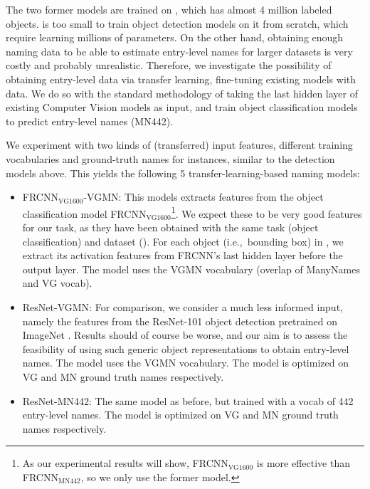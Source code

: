 The two former models are trained on \vg, which has almost 4 million labeled objects.
\mn is too small to train object detection models on it from scratch, which require learning millions of parameters.
On the other hand, obtaining enough naming data to be able to estimate entry-level names for larger datasets is very costly and probably unrealistic.
Therefore, we investigate the possibility of obtaining entry-level data via transfer learning, fine-tuning existing models with \mn data.
We do so with the standard methodology of taking the last hidden layer of existing Computer Vision models as input, and train object classification models to predict entry-level names (MN442).

We experiment with two kinds of (transferred) input features, different training vocabularies and ground-truth names for instances, similar to the detection models above.
This yields the following 5 transfer-learning-based naming models:

\begin{small}
\begin{itemize}
\item FRCNN$_{\text{VG1600}}$-VGMN:  This models extracts features from the object classification model FRCNN$_{\text{VG1600}}$\footnote{As our experimental results will show, FRCNN$_{\text{VG1600}}$ is more effective than FRCNN$_{\text{MN442}}$, so we only use the former model.}. We expect these to be very good features for our task, as they have been obtained with the same task (object classification) and dataset (\vg).  For each object (i.e.,~bounding box) in \mn, we extract its activation features from FRCNN's last hidden layer before the output layer. The model uses the VGMN vocabulary (overlap of ManyNames and VG vocab).
\item ResNet-VGMN: For comparison, we consider a much less informed input, namely the features from the ResNet-101 object detection  pretrained on ImageNet \cite{+++}.
Results should of course be worse, and our aim is to assess the feasibility of using such generic object representations to obtain entry-level names. The model uses the VGMN vocabulary.  The model is optimized on VG and MN ground truth names respectively.
 \item  ResNet-MN442:  The same model as before, but trained with a vocab of 442 entry-level names. The model is optimized on VG and MN ground truth names respectively.
\end{itemize}
\end{small}


